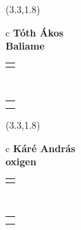 \documentclass[11pt]{article}
\begin{document}
\makebox(3.3,1.8){
  \renewcommand\arraystretch{1.3}
  \begin{tabular}[c]{c}
    \hspace{8.5mm}
    \LARGE\bf{ Tóth Ákos }\\
    \hspace{8.5mm}
    \Large{ Baliame }\\
    \renewcommand\arraystretch{3}
    \begin{tabular}[c]{c}
      \centering
      \fontfamily{phv}\selectfont{
        \textbf{
          \textsc{
            \scriptsize{
            \color{Dark}{ Ismerkedő }\color{Bright}{ Webmester }\color{Bright}{ Sminkmester }\color{Bright}{ Programozó }
            }
          }
        }
      }
    \end{tabular}
    \\
    \renewcommand\arraystretch{1}
    \begin{tabular}{p{3.3in}}
      \hspace{.7cm}\\
      \hspace{.7cm}\emph{  }\\
    \end{tabular}
  \end{tabular}
}

\makebox(3.3,1.8){
  \renewcommand\arraystretch{1.3}
  \begin{tabular}[c]{c}
    \hspace{8.5mm}
    \LARGE\bf{ Káré András }\\
    \hspace{8.5mm}
    \Large{ oxigen }\\
    \renewcommand\arraystretch{3}
    \begin{tabular}[c]{c}
      \centering
      \fontfamily{phv}\selectfont{
        \textbf{
          \textsc{
            \scriptsize{
            \color{Bright}{ Ismerkedő }\color{Dark}{ Webmester }\color{Dark}{ Sminkmester }\color{Bright}{ Programozó }
            }
          }
        }
      }
    \end{tabular}
    \\
    \renewcommand\arraystretch{1}
    \begin{tabular}{p{3.3in}}
      \hspace{.7cm}\\
      \hspace{.7cm}\emph{  }\\
    \end{tabular}
  \end{tabular}
}
\end{document}
